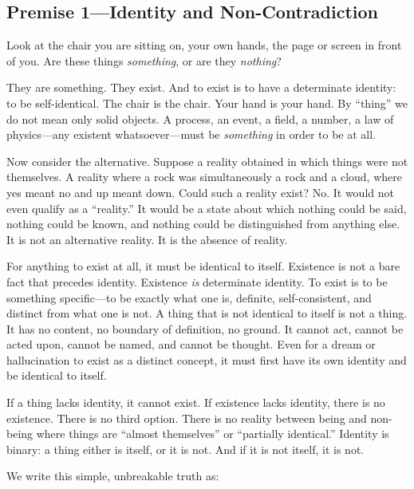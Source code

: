 \documentclass[11pt]{article}
\theoremstyle{canonstyle}
\begin{document}
\subsection{Premise 1---Identity and Non-Contradiction}

\begin{reflect}
Look at the chair you are sitting on, your own hands, the page or screen in front of you. Are these things \emph{something}, or are they \emph{nothing}?
\end{reflect}

They are something. They exist. And to exist is to have a determinate identity: to be self-identical. The chair is the chair. Your hand is your hand. By ``thing'' we do not mean only solid objects. A process, an event, a field, a number, a law of physics---any existent whatsoever---must be \emph{something} in order to be at all.

Now consider the alternative. Suppose a reality obtained in which things were not themselves. A reality where a rock was simultaneously a rock and a cloud, where yes meant no and up meant down. Could such a reality exist? No. It would not even qualify as a ``reality.'' It would be a state about which nothing could be said, nothing could be known, and nothing could be distinguished from anything else. It is not an alternative reality. It is the absence of reality.

For anything to exist at all, it must be identical to itself. Existence is not a bare fact that precedes identity. Existence \emph{is} determinate identity. To exist is to be something specific---to be exactly what one is, definite, self-consistent, and distinct from what one is not. A thing that is not identical to itself is not a thing. It has no content, no boundary of definition, no ground. It cannot act, cannot be acted upon, cannot be named, and cannot be thought. Even for a dream or hallucination to exist as a distinct concept, it must first have its own identity and be identical to itself.

If a thing lacks identity, it cannot exist. If existence lacks identity, there is no existence. There is no third option. There is no reality between being and non-being where things are ``almost themselves'' or ``partially identical.'' Identity is binary: a thing either is itself, or it is not. And if it is not itself, it is not.

We write this simple, unbreakable truth as:
\end{document}
